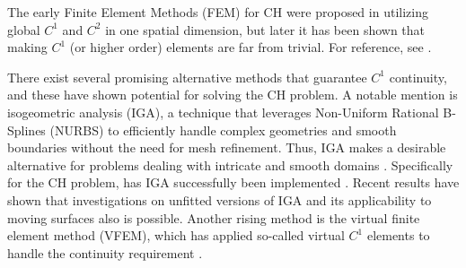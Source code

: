 The early Finite Element Methods (FEM) for CH were proposed in \cite{elliott1987numerical, elliott1986cahn} utilizing global $C^{1}$ and $C^{2}$ in one spatial dimension, but later it has been shown that making $C^{1}$ (or higher order) elements are far from trivial. For
reference, see \cite{kapl2021family, percell1976cubic, argyris1968tuba}.

There exist several promising alternative methods that guarantee $C^{1}$ continuity, and these have shown potential for solving the CH problem. A notable mention is isogeometric analysis (IGA), a technique that leverages Non-Uniform
Rational B-Splines (NURBS) to efficiently handle complex geometries and smooth boundaries without the need for mesh refinement. Thus, IGA makes a desirable alternative for problems dealing with intricate and smooth domains
\cite{hughes2005isogeometric}. Specifically for the CH problem, has IGA successfully been implemented \cite{kastner2016isogeometric, gomez2008isogeometric}. Recent results have shown that investigations on unfitted versions of IGA
\cite{zhao2017variational} and its applicability to moving surfaces \cite{zimmermann2019isogeometric} also is possible.
Another rising method is the virtual finite element method (VFEM), which has applied so-called virtual $C^{1}$ elements to handle the continuity requirement \cite{antonietti2016c}.


